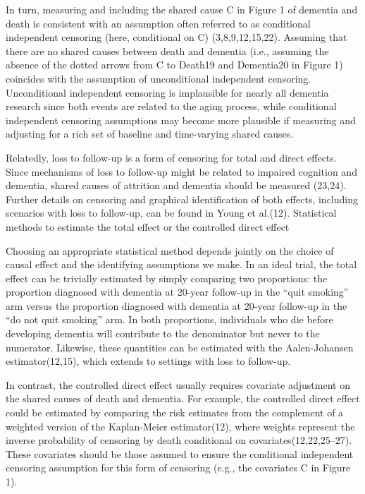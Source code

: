\documentclass[
]{book}
\begin{document}
In turn, measuring and including the shared cause C in Figure 1 of dementia and death is consistent with an assumption often referred to as conditional independent censoring (here, conditional on C) (3,8,9,12,15,22). Assuming that there are no shared causes between death and dementia (i.e., assuming the absence of the dotted arrows from C to Death19 and Dementia20 in Figure 1) coincides with the assumption of unconditional independent censoring. Unconditional independent censoring is implausible for nearly all dementia research since both events are related to the aging process, while conditional independent censoring assumptions may become more plausible if measuring and adjusting for a rich set of baseline and time-varying shared causes.

Relatedly, loss to follow-up is a form of censoring for total and direct effects. Since mechanisms of loss to follow-up might be related to impaired cognition and dementia, shared causes of attrition and dementia should be measured (23,24). Further details on censoring and graphical identification of both effects, including scenarios with loss to follow-up, can be found in Young et al.(12).
Statistical methods to estimate the total effect or the controlled direct effect

Choosing an appropriate statistical method depends jointly on the choice of causal effect and the identifying assumptions we make. In an ideal trial, the total effect can be trivially estimated by simply comparing two proportions: the proportion diagnosed with dementia at 20-year follow-up in the ``quit smoking'' arm versus the proportion diagnosed with dementia at 20-year follow-up in the ``do not quit smoking'' arm. In both proportions, individuals who die before developing dementia will contribute to the denominator but never to the numerator. Likewise, these quantities can be estimated with the Aalen-Johansen estimator(12,15), which extends to settings with loss to follow-up.

In contrast, the controlled direct effect usually requires covariate adjustment on the shared causes of death and dementia. For example, the controlled direct effect could be estimated by comparing the risk estimates from the complement of a weighted version of the Kaplan-Meier estimator(12), where weights represent the inverse probability of censoring by death conditional on covariates(12,22,25--27). These covariates should be those assumed to ensure the conditional independent censoring assumption for this form of censoring (e.g., the covariates C in Figure 1).
\end{document}
